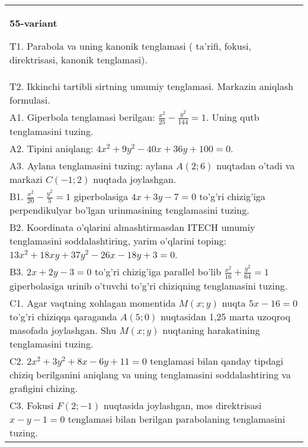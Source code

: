 \documentclass{article}
\begin{document}
\begin{tabular}{m{17cm}}
\textbf{55-variant}
\newline

T1. Parabola va uning kanonik tenglamasi ( ta'rifi, fokusi, direktrisasi, kanonik tenglamasi).\\

T2. Ikkinchi tartibli sirtning umumiy tenglamasi. Markazin aniqlash formulasi.\\

A1. Giperbola tenglamasi berilgan: $\frac{x^{2}}{25}-\frac{y^{2}}{144}=1$. Uning qutb tenglamasini tuzing.\\

A2. Tipini aniqlang: $4x^2+9y^2-40x+36y+100=0$.\\

A3. Aylana tenglamasini tuzing: aylana $A(2;6)$ nuqtadan o'tadi va markazi $C(-1;2)$ nuqtada joylashgan.\\

B1. $\frac{x^{2}}{20} - \frac{y^{2}}{5} = 1$ giperbolasiga $4x + 3y - 7 = 0$ to'g'ri chizig'iga perpendikulyar bo'lgan urinmasining tenglamasini tuzing.  \\

B2. Koordinata o'qlarini almashtirmasdan ITECH umumiy tenglamasini soddalashtiring, yarim o'qlarini toping: $13x^{2} + 18xy + 37y^{2} - 26x - 18y + 3 = 0$.  \\

B3. $2x + 2y - 3 = 0$ to'g'ri chizig'iga parallel bo'lib $\frac{x^{2}}{16} + \frac{y^{2}}{64} = 1$ giperbolasiga urinib o'tuvchi to'g'ri chiziqning tenglamasini tuzing.  \\

C1. Agar vaqtning xohlagan momentida $M(x;y)$ nuqta $5x - 16 = 0$ to'g'ri chiziqqa qaraganda $A(5;0)$ nuqtasidan 1,25 marta uzoqroq masofada joylashgan. Shu $M(x;y)$ nuqtaning harakatining tenglamasini tuzing.  \\

C2. $2x^{2} + 3y^{2} + 8x - 6y + 11 = 0$ tenglamasi bilan qanday tipdagi chiziq berilganini aniqlang va uning tenglamasini soddalashtiring va grafigini chizing.  \\

C3. Fokusi $F(2; - 1)$ nuqtasida joylashgan, mos direktrisasi $x - y - 1 = 0$ tenglamasi bilan berilgan parabolaning tenglamasini tuzing.  \\

\end{tabular}
\vspace{1cm}
\end{document}
